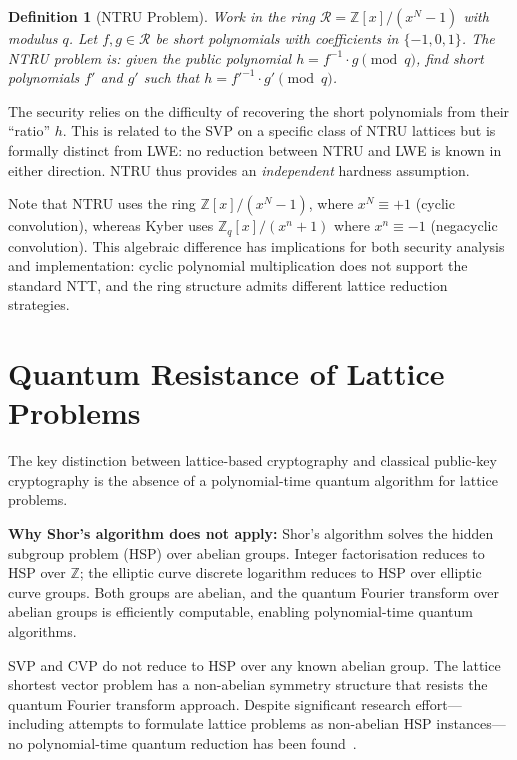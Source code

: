 \documentclass[12pt,a4paper]{report}
\newtheorem{definition}{Definition}[chapter]
\begin{document}
\begin{definition}[NTRU Problem]
Work in the ring $\mathcal{R} = \mathbb{Z}[x]/(x^N - 1)$ with modulus $q$. Let
$f, g \in \mathcal{R}$ be short polynomials with coefficients in $\{-1, 0, 1\}$.
The NTRU problem is: given the public polynomial $h = f^{-1} \cdot g \pmod{q}$,
find short polynomials $f'$ and $g'$ such that $h = f'^{-1} \cdot g' \pmod{q}$.
\end{definition}

The security relies on the difficulty of recovering the short polynomials from their
``ratio'' $h$. This is related to the SVP on a specific class of NTRU lattices but is
formally distinct from LWE: no reduction between NTRU and LWE is known in either
direction. NTRU thus provides an \emph{independent} hardness assumption.

Note that NTRU uses the ring $\mathbb{Z}[x]/(x^N - 1)$, where $x^N \equiv +1$
(cyclic convolution), whereas Kyber uses $\mathbb{Z}_q[x]/(x^n + 1)$ where
$x^n \equiv -1$ (negacyclic convolution). This algebraic difference has implications
for both security analysis and implementation: cyclic polynomial multiplication does
not support the standard NTT, and the ring structure admits different lattice reduction
strategies.

\section{Quantum Resistance of Lattice Problems}

The key distinction between lattice-based cryptography and classical public-key
cryptography is the absence of a polynomial-time quantum algorithm for lattice problems.

\textbf{Why Shor's algorithm does not apply:} Shor's algorithm solves the hidden
subgroup problem (HSP) over abelian groups. Integer factorisation reduces to HSP over
$\mathbb{Z}$; the elliptic curve discrete logarithm reduces to HSP over elliptic curve
groups. Both groups are abelian, and the quantum Fourier transform over abelian groups
is efficiently computable, enabling polynomial-time quantum algorithms.

SVP and CVP do not reduce to HSP over any known abelian group. The lattice shortest
vector problem has a non-abelian symmetry structure that resists the quantum Fourier
transform approach. Despite significant research effort---including attempts to
formulate lattice problems as non-abelian HSP instances---no polynomial-time quantum
reduction has been found~\cite{peikert2016}.
\end{document}
